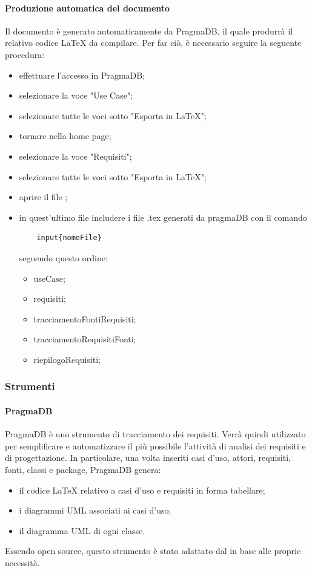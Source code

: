 \paragraph{Produzione automatica del documento \ARdoc}
Il documento \ARdoc{} è generato automaticamente da PragmaDB, il quale produrrà il relativo codice \LaTeX{} da compilare.
Per far ciò, è necessario seguire la seguente procedura:
\begin{itemize}
	\item effettuare l'accesso in PragmaDB;
	\item selezionare la voce "Use Case";
	\item selezionare tutte le voci sotto "Esporta in \LaTeX";
	\item tornare nella home page;
	\item selezionare la voce "Requisiti";
	\item selezionare tutte le voci sotto "Esporta in \LaTeX";
	\item aprire il file \ARfile;
	\item in quest'ultimo file includere i file .tex generati da pragmaDB con il comando \begin{lstlisting}
	input{nomeFile}
	\end{lstlisting}
	seguendo questo ordine:
	\begin{itemize}
		\item useCase;
		\item requisiti;
		\item tracciamentoFontiRequisiti;
		\item tracciamentoRequisitiFonti;
		\item riepilogoRequisiti;
	\end{itemize}
\end{itemize}

\subsubsection{Strumenti}
 \paragraph{PragmaDB}
  PragmaDB è uno strumento  di tracciamento dei requisiti. Verrà quindi utilizzato per semplificare e automatizzare il più possibile l'attività di analisi dei requisiti e di progettazione. In particolare, una volta inseriti casi d'uso, attori, requisiti, fonti, classi e package, PragmaDB genera:
  \begin{itemize}
  \item il codice \LaTeX{} relativo a casi d'uso e requisiti in forma tabellare;
  \item i diagrammi UML associati ai casi d'uso;
  \item il diagramma UML di ogni classe.

  \end{itemize}
  Essendo open source, questo strumento è stato adattato dal  \GRUPPO{} in base alle proprie necessità.

